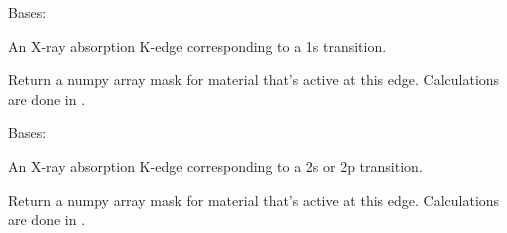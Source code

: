 \documentclass[letterpaper,10pt,english]{sphinxmanual}
\begin{document}
\begin{fulllineitems}
\label{\detokenize{xanespy:xanespy.edges.KEdge}}
Bases: {\hyperref[\detokenize{xanespy:xanespy.edges.Edge}]{}}

An X-ray absorption K-edge corresponding to a 1s transition.

\begin{fulllineitems}
\label{\detokenize{xanespy:xanespy.edges.KEdge.annotate_spectrum}}
\end{fulllineitems}


\begin{fulllineitems}
\label{\detokenize{xanespy:xanespy.edges.KEdge.mask}}
Return a numpy array mask for material that's active at this
edge. Calculations are done in .

\end{fulllineitems}


\end{fulllineitems}


\begin{fulllineitems}
\label{\detokenize{xanespy:xanespy.edges.LEdge}}
Bases: {\hyperref[\detokenize{xanespy:xanespy.edges.Edge}]{}}

An X-ray absorption K-edge corresponding to a 2s or 2p
transition.

\begin{fulllineitems}
\label{\detokenize{xanespy:xanespy.edges.LEdge.annotate_spectrum}}
\end{fulllineitems}


\begin{fulllineitems}
\label{\detokenize{xanespy:xanespy.edges.LEdge.mask}}
Return a numpy array mask for material that's active at this
edge. Calculations are done in .

\end{fulllineitems}


\end{fulllineitems}
\end{document}
